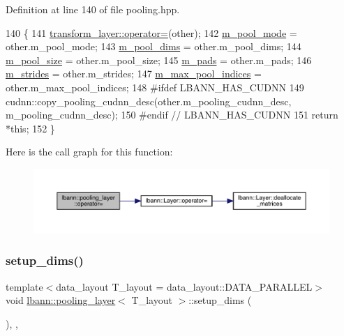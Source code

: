 Definition at line 140 of file pooling.\+hpp.


\begin{DoxyCode}
140                                                       \{
141     \hyperlink{classlbann_1_1Layer_a00d8acde68fda2f38c4a39ef8c89234a}{transform\_layer::operator=}(other);
142     \hyperlink{classlbann_1_1pooling__layer_a7b19407c88f89757e64ed3d4afab8443}{m\_pool\_mode} = other.m\_pool\_mode;
143     \hyperlink{classlbann_1_1pooling__layer_abb52fe974f602921823a46320fd7d075}{m\_pool\_dims} = other.m\_pool\_dims;
144     \hyperlink{classlbann_1_1pooling__layer_a8b3a9020bb896a1132c9823bc2c73515}{m\_pool\_size} = other.m\_pool\_size;
145     \hyperlink{classlbann_1_1pooling__layer_a22fd39aa4358149110a369ddf0e5ffdb}{m\_pads} = other.m\_pads;
146     \hyperlink{classlbann_1_1pooling__layer_a754bb6d49b39e915f315ca0049c953d9}{m\_strides} = other.m\_strides;
147     \hyperlink{classlbann_1_1pooling__layer_a58683798db4c48175cbad5ec32ff676c}{m\_max\_pool\_indices} = other.m\_max\_pool\_indices;
148 \textcolor{preprocessor}{  #ifdef LBANN\_HAS\_CUDNN}
149     cudnn::copy\_pooling\_cudnn\_desc(other.m\_pooling\_cudnn\_desc, m\_pooling\_cudnn\_desc);
150 \textcolor{preprocessor}{  #endif // LBANN\_HAS\_CUDNN}
151     \textcolor{keywordflow}{return} *\textcolor{keyword}{this};
152   \}
\end{DoxyCode}
Here is the call graph for this function\+:\nopagebreak
\begin{figure}[H]
\begin{center}
\leavevmode
\includegraphics[width=350pt]{classlbann_1_1pooling__layer_acd09fc03a5c22c4127222b722c4d6ce5_cgraph}
\end{center}
\end{figure}
\mbox{\label{classlbann_1_1pooling__layer_a5de83fe60224067c132b0f1d53024b57}} 
\subsubsection{\texorpdfstring{setup\+\_\+dims()}{setup\_dims()}}
{\footnotesize\ttfamily template$<$data\+\_\+layout T\+\_\+layout = data\+\_\+layout\+::\+D\+A\+T\+A\+\_\+\+P\+A\+R\+A\+L\+L\+EL$>$ \\
void \hyperlink{classlbann_1_1pooling__layer}{lbann\+::pooling\+\_\+layer}$<$ T\+\_\+layout $>$\+::setup\+\_\+dims (\begin{DoxyParamCaption}{ }\end{DoxyParamCaption})\hspace{0.3cm}{\ttfamily [inline]}, {\ttfamily [override]}, {\ttfamily [virtual]}}

